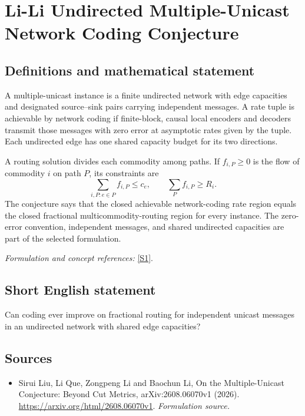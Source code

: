 \documentclass[11pt]{article}
\begin{document}
\section*{\texorpdfstring{Li-Li Undirected Multiple-Unicast Network Coding Conjecture}{Li-Li Undirected Multiple-Unicast Network Coding Conjecture}}\label{30006942}
\subsection{Definitions and mathematical statement}
A multiple-unicast instance is a finite undirected network with edge capacities and designated source--sink pairs carrying independent messages. A rate tuple is achievable by network coding if finite-block, causal local encoders and decoders transmit those messages with zero error at asymptotic rates given by the tuple. Each undirected edge has one shared capacity budget for its two directions.

A routing solution divides each commodity among paths. If $f_{i,P}\ge0$ is the flow of commodity $i$ on path $P$, its constraints are
\[
 \sum_{i,P:e\in P}f_{i,P}\le c_e,
 \qquad \sum_Pf_{i,P}\ge R_i.
\]
The conjecture says that the closed achievable network-coding rate region equals the closed fractional multicommodity-routing region for every instance. The zero-error convention, independent messages, and shared undirected capacities are part of the selected formulation.
\par\smallskip\textit{Formulation and concept references:} \href{https://arxiv.org/html/2608.06070v1}{[S1]}.

\subsection{Short English statement}
Can coding ever improve on fractional routing for independent unicast messages in an undirected network with shared edge capacities?
\subsection{Sources}
\begin{itemize}
\item[S1]Sirui Liu, Li Que, Zongpeng Li and Baochun Li, On the Multiple-Unicast Conjecture: Beyond Cut Metrics, arXiv:2608.06070v1 (2026).
\url{https://arxiv.org/html/2608.06070v1}.
\textit{Formulation source.}
\end{itemize}
\end{document}
